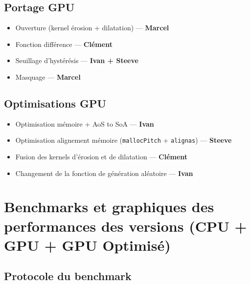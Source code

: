 \documentclass[12pt]{article}
\begin{document}
    \subsection{Portage GPU}
    \begin{itemize}[leftmargin=1.5cm]
    \item Ouverture (kernel érosion + dilatation) \hfill --- \textbf{Marcel}
    \item Fonction différence \hfill --- \textbf{Clément}
    \item Seuillage d'hystérésis \hfill --- \textbf{Ivan + Steeve}
    \item Masquage \hfill --- \textbf{Marcel}
    \end{itemize}

    \subsection{Optimisations GPU}
    \begin{itemize}[leftmargin=1.5cm]
    \item Optimisation mémoire + AoS to SoA \hfill --- \textbf{Ivan}
    \item Optimisation alignement mémoire (\texttt{mallocPitch} + \texttt{alignas}) \hfill --- \textbf{Steeve}
    \item Fusion des kernels d'érosion et de dilatation \hfill --- \textbf{Clément}
    \item Changement de la fonction de génération aléatoire \hfill --- \textbf{Ivan}
    \end{itemize}

    \bigskip

    \section{Benchmarks et graphiques des performances des versions (CPU + GPU + GPU Optimisé)}
    \subsection{Protocole du benchmark}
\end{document}
